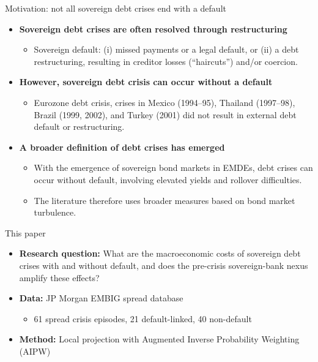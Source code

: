 \documentclass[aspectratio=169]{beamer}
\begin{document}
\begin{frame}{Motivation: not all sovereign debt crises end with a default}
 \footnotesize
  \begin{itemize}
  \footnotesize
    \item \textbf{Sovereign debt crises are often resolved through restructuring}
    \begin{itemize}
    \item Sovereign default: (i) missed payments or a legal default, or (ii) a debt restructuring, resulting in creditor losses (``haircuts'') and/or coercion. \citep{ams2019sovereign}
    \end{itemize}

    \item \textbf{However, sovereign debt crisis can occur without a default}
    \begin{itemize}
     \footnotesize
    \item Eurozone debt crisis, crises in Mexico (1994--95), Thailand (1997--98), Brazil (1999, 2002), and Turkey (2001) did not result in external debt default or restructuring.
    \end{itemize}


    \item \textbf{A broader definition of debt crises has emerged}
    \begin{itemize}
 \footnotesize
    \item With the emergence of sovereign bond markets in EMDEs, debt crises can occur without default, involving elevated yields and rollover difficulties.

  \item The literature therefore uses broader measures based on bond market turbulence.


    \end{itemize}
  \end{itemize}
\end{frame}

\begin{frame}{This paper}

 \footnotesize
  \begin{itemize}

    \item \textbf{Research question:} What are the macroeconomic costs of sovereign debt crises with and without default, and does the pre-crisis sovereign-bank nexus amplify these effects?

    \item \textbf{Data:} JP Morgan EMBIG spread database
    \begin{itemize}
 \footnotesize
      \item 61 spread crisis episodes, 21 default-linked, 40 non-default
    \end{itemize}

    \item \textbf{Method:} Local projection with Augmented Inverse Probability
    Weighting (AIPW)

  \end{itemize}
\end{frame}
\end{document}
